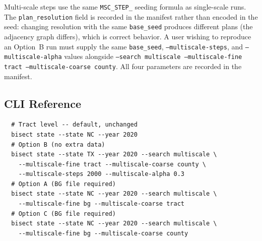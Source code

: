 Multi-scale steps use the same \texttt{MSC\_STEP\_} seeding formula as
single-scale runs.
The \texttt{plan\_resolution} field is recorded in the manifest rather
than encoded in the seed: changing resolution with the same
\texttt{base\_seed} produces different plans (the adjacency graph differs),
which is correct behavior.
A user wishing to reproduce an Option~B run must supply the same
\texttt{base\_seed}, \texttt{--multiscale-steps}, and
\texttt{--multiscale-alpha} values alongside \texttt{--search multiscale
--multiscale-fine tract --multiscale-coarse county}.
All four parameters are recorded in the manifest.

\subsection{CLI Reference}

\begin{verbatim}
  # Tract level -- default, unchanged
  bisect state --state NC --year 2020
  # Option B (no extra data)
  bisect state --state TX --year 2020 --search multiscale \
    --multiscale-fine tract --multiscale-coarse county \
    --multiscale-steps 2000 --multiscale-alpha 0.3
  # Option A (BG file required)
  bisect state --state NC --year 2020 --search multiscale \
    --multiscale-fine bg --multiscale-coarse tract
  # Option C (BG file required)
  bisect state --state NC --year 2020 --search multiscale \
    --multiscale-fine bg --multiscale-coarse county
\end{verbatim}
